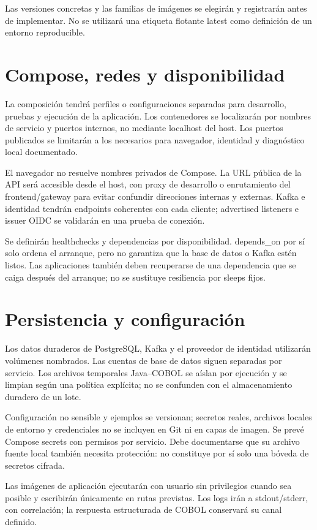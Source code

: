 Las versiones concretas y las familias de imágenes se elegirán y registrarán antes de implementar. No se utilizará una etiqueta flotante latest como definición de un entorno reproducible.

\section{Compose, redes y disponibilidad}
La composición tendrá perfiles o configuraciones separadas para desarrollo, pruebas y ejecución de la aplicación. Los contenedores se localizarán por nombres de servicio y puertos internos, no mediante localhost del host. Los puertos publicados se limitarán a los necesarios para navegador, identidad y diagnóstico local documentado.

El navegador no resuelve nombres privados de Compose. La URL pública de la API será accesible desde el host, con proxy de desarrollo o enrutamiento del frontend/gateway para evitar confundir direcciones internas y externas. Kafka e identidad tendrán endpoints coherentes con cada cliente; advertised listeners e issuer OIDC se validarán en una prueba de conexión.

Se definirán healthchecks y dependencias por disponibilidad. depends\_on por sí solo ordena el arranque, pero no garantiza que la base de datos o Kafka estén listos. Las aplicaciones también deben recuperarse de una dependencia que se caiga después del arranque; no se sustituye resiliencia por sleeps fijos.

\section{Persistencia y configuración}
Los datos duraderos de PostgreSQL, Kafka y el proveedor de identidad utilizarán volúmenes nombrados. Las cuentas de base de datos siguen separadas por servicio. Los archivos temporales Java--COBOL se aíslan por ejecución y se limpian según una política explícita; no se confunden con el almacenamiento duradero de un lote.

Configuración no sensible y ejemplos se versionan; secretos reales, archivos locales de entorno y credenciales no se incluyen en Git ni en capas de imagen. Se prevé Compose secrets con permisos por servicio. Debe documentarse que su archivo fuente local también necesita protección: no constituye por sí solo una bóveda de secretos cifrada.

Las imágenes de aplicación ejecutarán con usuario sin privilegios cuando sea posible y escribirán únicamente en rutas previstas. Los logs irán a stdout/stderr, con correlación; la respuesta estructurada de COBOL conservará su canal definido.

